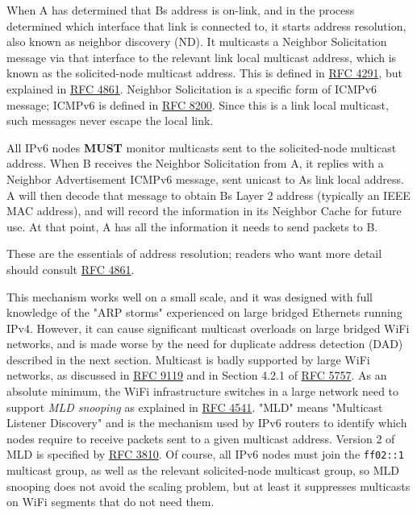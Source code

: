 \documentclass[
]{article}
\begin{document}
When A has determined that B\textquotesingle s address is on-link, and
in the process determined which interface that link is connected to, it
starts address resolution, also known as neighbor discovery (ND). It
multicasts a Neighbor Solicitation message via that interface to the
relevant link local multicast address, which is known as the
solicited-node multicast address. This is defined in
\href{https://www.rfc-editor.org/info/rfc4291}{RFC 4291}, but explained
in \href{https://www.rfc-editor.org/info/rfc4861}{RFC 4861}. Neighbor
Solicitation is a specific form of ICMPv6 message; ICMPv6 is defined in
\href{https://www.rfc-editor.org/info/rfc8200}{RFC 8200}. Since this is
a link local multicast, such messages never escape the local link.

All IPv6 nodes \textbf{MUST} monitor multicasts sent to the
solicited-node multicast address. When B receives the Neighbor
Solicitation from A, it replies with a Neighbor Advertisement ICMPv6
message, sent unicast to A\textquotesingle s link local address. A will
then decode that message to obtain B\textquotesingle s Layer 2 address
(typically an IEEE MAC address), and will record the information in its
Neighbor Cache for future use. At that point, A has all the information
it needs to send packets to B.

These are the essentials of address resolution; readers who want more
detail should consult \href{https://www.rfc-editor.org/info/rfc4861}{RFC
4861}.

This mechanism works well on a small scale, and it was designed with
full knowledge of the "ARP storms" experienced on large bridged
Ethernets running IPv4. However, it can cause significant multicast
overloads on large bridged WiFi networks, and is made worse by the need
for duplicate address detection (DAD) described in the next section.
Multicast is badly supported by large WiFi networks, as discussed in
\href{https://www.rfc-editor.org/info/rfc9119}{RFC 9119} and in Section
4.2.1 of \href{https://www.rfc-editor.org/info/rfc5757}{RFC 5757}. As an
absolute minimum, the WiFi infrastructure switches in a large network
need to support \emph{MLD snooping} as explained in
\href{https://www.rfc-editor.org/info/rfc4541}{RFC 4541}. "MLD" means
"Multicast Listener Discovery" and is the mechanism used by IPv6 routers
to identify which nodes require to receive packets sent to a given
multicast address. Version 2 of MLD is specified by
\href{https://www.rfc-editor.org/info/rfc3810}{RFC 3810}. Of course, all
IPv6 nodes must join the \texttt{ff02::1} multicast group, as well as
the relevant solicited-node multicast group, so MLD snooping does not
avoid the scaling problem, but at least it suppresses multicasts on WiFi
segments that do not need them.
\end{document}

